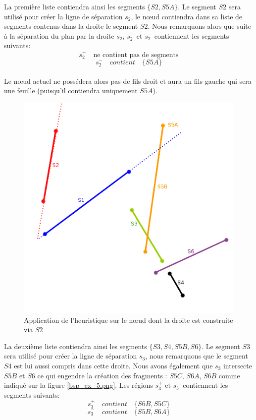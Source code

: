 \documentclass[11pt,a4paper]{article}
\theoremstyle{definition}
\theoremstyle{remark}
\begin{document}
La première liste contiendra ainsi les segments $\{S2, S5A\}$. Le segment $S2$ sera utilisé pour créer la ligne de séparation $s_2$, le nœud contiendra dans sa liste de segments contenus dans la droite le segment $S2$. Nous remarquons alors que suite à la séparation du plan par la droite $s_2$, $s_2^+$ et $s_2^-$ contiennent les segments suivants:\\
$$s_2^+ \quad \text{ne contient pas de segments}$$
$$s_2^- \quad contient\quad \{S5A\}$$
\\
Le nœud actuel ne possédera alors pas de fils droit et aura un fils gauche qui sera une feuille (puisqu'il contiendra uniquement $S5A$).\\

\begin{figure}[H]
\centering
\includegraphics[scale=0.6]{bsp_ex_4.png}
\caption{Application de l'heuristique sur le nœud dont la droite est construite via $S2$}
\label{bsp_ex_4}
\end{figure}
\newpage

La deuxième liste contiendra ainsi les segments $\{S3,S4,S5B,S6\}$. Le segment $S3$ sera utilisé pour créer la ligne de séparation $s_3$, nous remarquons que le segment $S4$ est lui aussi compris dans cette droite. Nous avons également que $s_3$ intersecte $S5B$ et $S6$ ce qui engendre la création des fragments : $S5C$, $S6A$, $S6B$ comme indiqué sur la figure \ref{bsp_ex_5.png}. Les régions $s_3^+$ et $s_3^-$ contiennent les segments suivants:\\
$$s_3^+ \quad contient\quad \{S6B, S5C\}$$
$$s_3^- \quad contient\quad \{S5B,S6A\}$$
\end{document}
